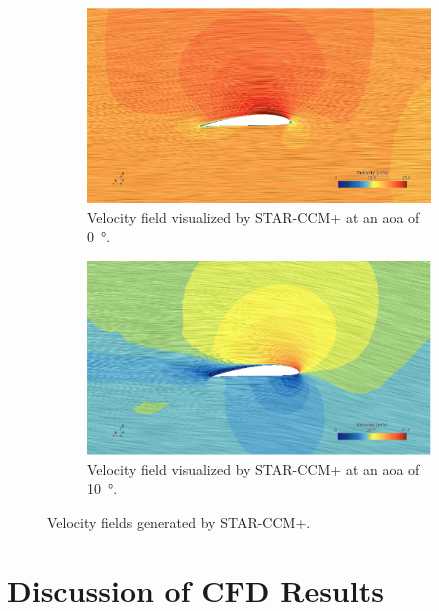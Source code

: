 \begin{figure}[htpb]
    \centering
    \begin{subfigure}{0.49\textwidth}
        \centering
        \includegraphics[width=\textwidth]{Figures/v_field_at_aoa_0_deg.png}
        \caption{Velocity field visualized by STAR-CCM+ at an \acrshort{aoa} of \qty{0}{\degree}.}
        \label{fig:v_field_0_deg}
    \end{subfigure}
    \begin{subfigure}{0.49\textwidth}
        \centering
        \includegraphics[width=\textwidth]{Figures/v_field_at_aoa_10_deg.png}
        \caption{Velocity field visualized by STAR-CCM+ at an \acrshort{aoa} of \qty{10}{\degree}.}
        \label{fig:v_field_10_deg}
    \end{subfigure}
    \caption[Velocity field from STAR-CCM+]{Velocity fields generated by STAR-CCM+.}
    \label{fig:star-ccm+_velocity}
\end{figure}

\section{Discussion of CFD Results}\label{sec:discussion}

